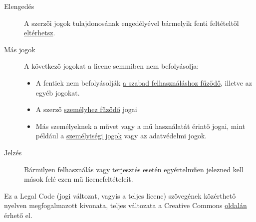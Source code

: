 \documentclass[a4paper, titlepage]{report}
\begin{document}
\begin{description}
 \item[Elengedés] A szerzői jogok tulajdonosának engedélyével bármelyik fenti feltételtől \href{http://creativecommons.org/licenses/by-sa/2.5/hu/#}{eltérhetsz}.
 \item[Más jogok] A következő jogokat a licenc semmiben nem befolyásolja:
 \begin{itemize}
  \item A fentiek nem befolyásolják \href{http://wiki.creativecommons.org/Frequently_Asked_Questions#Do_Creative_Commons_licenses_affect_fair_use.2C_fair_dealing_or_other_exceptions_to_copyright.3F}{a szabad felhasználáshoz fűződő}, illetve az egyéb jogokat.
  \item A szerző \href{http://wiki.creativecommons.org/Frequently_Asked_Questions#I_don.E2.80.99t_like_the_way_a_person_has_used_my_work_in_a_derivative_work_or_included_it_in_a_collective_work.3B_what_can_I_do.3F}{személyhez fűződő} jogai
  \item Más személyeknek a művet vagy a mű használatát érintő jogai, mint például a \href{http://wiki.creativecommons.org/Frequently_Asked_Questions#When_are_publicity_rights_relevant.3F}{személyiségi jogok} vagy az adatvédelmi jogok.
 \end{itemize}
 \item[Jelzés] Bármilyen felhasználás vagy terjesztés esetén egyértelműen jelezned kell mások felé ezen mű licencfeltételeit. 
\end{description}

Ez a Legal Code (jogi változat, vagyis a teljes licenc) szövegének közérthető nyelven megfogalmazott kivonata, teljes változata a Creative Commons \href{http://creativecommons.org/licenses/by-sa/2.5/hu/legalcode}{oldalán} érhető el.

\newpage
{}
\printindex

\newpage
{}
\listoftables

\newpage
{}
\listoffigures

\newpage
{}
\lstlistoflistings

\newpage
{}


\end{document}
